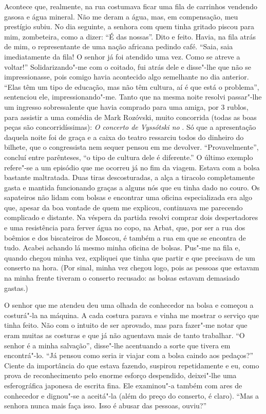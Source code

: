 Acontece que, realmente, na rua costumava ficar uma fila de carrinhos vendendo gasosa e água mineral. Não me deram a água, mas, em
compensação, meu prestígio subiu. No dia seguinte, a senhora com quem tinha gritado piscou para mim, zombeteira, como a dizer: ``É das nossas''. Dito e feito. Havia, na fila atrás de mim, o representante de uma nação africana pedindo café. ``Saia, saia imediatamente da fila! O senhor já foi atendido uma vez. Como se atreve a voltar!'' Solidarizando"-me com o coitado, fui atrás dele e disse"-lhe que não se impressionasse, pois comigo havia acontecido algo semelhante no dia anterior. ``Elas têm um tipo de educação, mas não têm cultura, aí é que está o problema'', sentenciou ele, impressionando"-me. Tanto que na mesma noite resolvi
passar"-lhe um ingresso sobressalente que havia comprado para uma amiga, por 3 rublos, para assistir a uma comédia de Mark Rozóvski, muito concorrida (todas as boas peças são concorridíssimas): \emph{O concerto de Vyssótski no }. Só que a apresentação daquela noite foi de graça e a caixa do teatro ressarciu todos do dinheiro do bilhete, que o congressista nem sequer pensou em me devolver. ``Provavelmente'', concluí entre parênteses, ``o tipo de cultura dele é diferente.'' O último exemplo refere"-se a um episódio que me ocorreu já no fim da viagem. Estava com a bolsa bastante maltratada. Duas tiras descosturadas, a alça a tiracolo completamente gasta e mantida funcionando graças a alguns nós que eu tinha dado no couro. Os sapateiros não lidam com bolsas e encontrar uma oficina especializada era algo que, apesar da boa vontade de quem me explicou, continuava me parecendo complicado e distante. Na véspera da partida resolvi comprar dois despertadores e uma resistência para ferver água no copo, na Arbat, que, por ser a rua dos boêmios e dos biscateiros de Moscou, é também a rua em que se encontra de tudo. Acabei achando lá mesmo minha oficina de bolsas. Pus"-me na fila e, quando chegou minha vez, expliquei que tinha que partir e que precisava de um conserto na hora. (Por sinal, minha vez chegou logo, pois as pessoas que estavam na minha frente tiveram o conserto recusado: as bolsas estavam demasiado gastas.)

O senhor que me atendeu deu uma olhada de conhecedor na bolsa e começou a costurá"-la na máquina. A cada costura parava e vinha me mostrar o serviço que tinha feito. Não com o intuito de ser aprovado, mas para fazer"-me notar que eram muitas as costuras e que já não aguentava mais de tanto trabalhar. ``O senhor é a minha salvação'', disse"-lhe acentuando a sorte que tivera em encontrá"-lo. ``Já pensou como seria ir viajar com a bolsa caindo aos pedaços?'' Ciente da importância do que estava fazendo, suspirou repetidamente e eu, como prova de reconhecimento pelo enorme esforço despendido, deixei"-lhe uma esferográfica japonesa de escrita fina. Ele examinou"-a também com ares de conhecedor e dignou"-se a aceitá"-la (além do preço do conserto, é claro). ``Mas a senhora nunca mais faça isso. Isso é abusar das pessoas, ouviu?''

